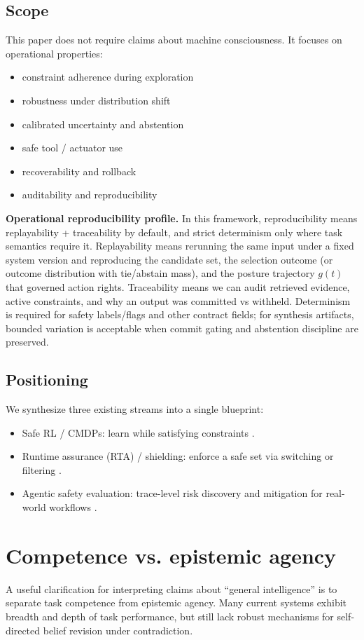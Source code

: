 \documentclass[11pt]{article}
\begin{document}
\subsection{Scope}
This paper does not require claims about machine consciousness. It focuses on operational properties:
\begin{itemize}
\item 
constraint adherence during exploration
\item 
robustness under distribution shift
\item 
calibrated uncertainty and abstention
\item 
safe tool / actuator use
\item 
recoverability and rollback
\item 
auditability and reproducibility
\end{itemize}
\noindent\textbf{Operational reproducibility profile.} In this framework, reproducibility means replayability + traceability by default, and strict determinism only where task semantics require it. Replayability means rerunning the same input under a fixed system version and reproducing the candidate set, the selection outcome (or outcome distribution with tie/abstain mass), and the posture trajectory $g(t)$ that governed action rights. Traceability means we can audit retrieved evidence, active constraints, and why an output was committed vs withheld. Determinism is required for safety labels/flags and other contract fields; for synthesis artifacts, bounded variation is acceptable when commit gating and abstention discipline are preserved.
\subsection{Positioning}
We synthesize three existing streams into a single blueprint:
\begin{itemize}
\item 
Safe RL / CMDPs: learn while satisfying constraints \citep{kushwaha2025saferl_cmdp_survey,ni2025safe_exploration_cmdp}.
\item 
Runtime assurance (RTA) / shielding: enforce a safe set via switching or filtering \citep{miller2024rta_rl_iccps}.
\item 
Agentic safety evaluation: trace-level risk discovery and mitigation for real-world workflows
\citep{ghosh2025agentic}.
\end{itemize}
\section{Competence vs. epistemic agency}
A useful clarification for interpreting claims about “general intelligence” is to separate task competence
from epistemic agency. Many current systems exhibit breadth and depth of task performance, but
still lack robust mechanisms for self-directed belief revision under contradiction.
\end{document}

